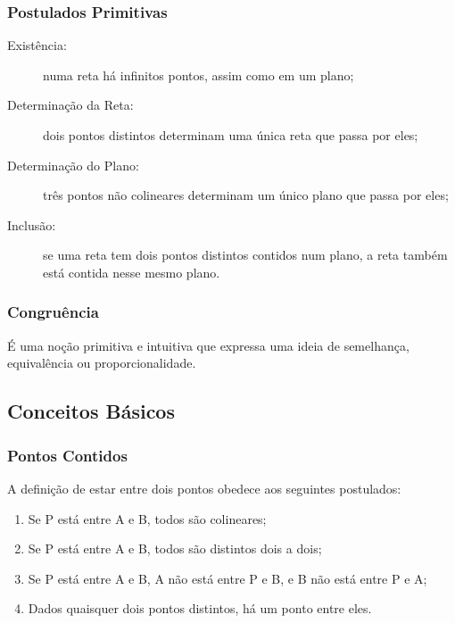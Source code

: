     \subsubsection{Postulados Primitivas}
        \begin{description}
            \item[Existência:] numa reta há infinitos pontos, assim como em um plano;
            \item[Determinação da Reta:] dois pontos distintos determinam uma única reta que passa por eles;
            \item[Determinação do Plano:] três pontos não colineares determinam um único plano que passa por eles;
            \item[Inclusão:] se uma reta tem dois pontos distintos contidos num plano, a reta também está contida nesse mesmo plano.
        \end{description}
    \subsubsection{Congruência}
        É uma noção primitiva e intuitiva que expressa uma ideia de semelhança, equivalência ou proporcionalidade.
\subsection{Conceitos Básicos}
    \subsubsection{Pontos Contidos}
        A definição de estar entre dois pontos obedece aos seguintes postulados:
        \begin{enumerate}
            \item Se P está entre A e B, todos são colineares;
            \item Se P está entre A e B, todos são distintos dois a dois;
            \item Se P está entre A e B, A não está entre P e B, e B não está entre P e A;
            \item Dados quaisquer dois pontos distintos, há um ponto entre eles.
        \end{enumerate}
